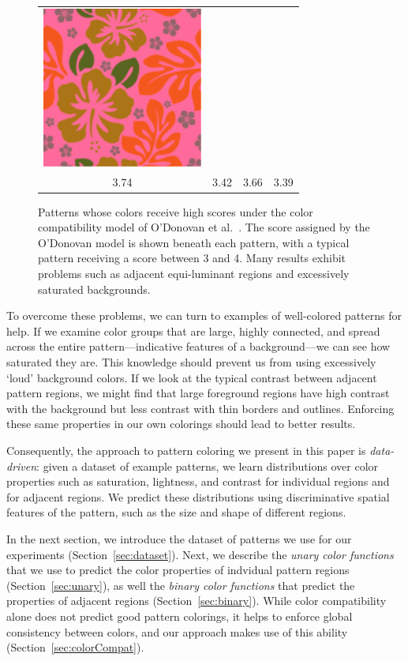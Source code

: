 \begin{figure}[htb]
\begin{tabular}{cccc}
\includegraphics[width=.2\columnwidth]{figs/colorCompat/r_1_3_3-39}\\
3.74&3.42&3.66&3.39\\
\end{tabular}
\caption{Patterns whose colors receive high scores under the color compatibility model of O'Donovan et al.~. The score assigned by the O'Donovan model is shown beneath each pattern, with a typical pattern receiving a score between 3 and 4. Many results exhibit problems such as adjacent equi-luminant regions and excessively saturated backgrounds.}
\label{fig:ColorCompatOnly}
\end{figure}

To overcome these problems, we can turn to examples of well-colored patterns for help. If we examine color groups that are large, highly connected, and spread across the entire pattern---indicative features of a background---we can see how saturated they are. This knowledge should prevent us from using excessively `loud' background colors. If we look at the typical contrast between adjacent pattern regions, we might find that large foreground regions have high contrast with the background but less contrast with thin borders and outlines. Enforcing these same properties in our own colorings should lead to better results.

Consequently, the approach to pattern coloring we present in this paper is \emph{data-driven}: given a dataset of example patterns, we learn distributions over color properties such as saturation, lightness, and contrast for individual regions and for adjacent regions. We predict these distributions using discriminative spatial features of the pattern, such as the size and shape of different regions.

In the next section, we introduce the dataset of patterns we use for our experiments (Section~\ref{sec:dataset}). Next, we describe the \emph{unary color functions} that we use to predict the color properties of indvidual pattern regions (Section~\ref{sec:unary}), as well the \emph{binary color functions} that predict the properties of adjacent regions (Section~\ref{sec:binary}). While color compatibility alone does not predict good pattern colorings, it helps to enforce global consistency between colors, and our approach makes use of this ability (Section~\ref{sec:colorCompat}).

